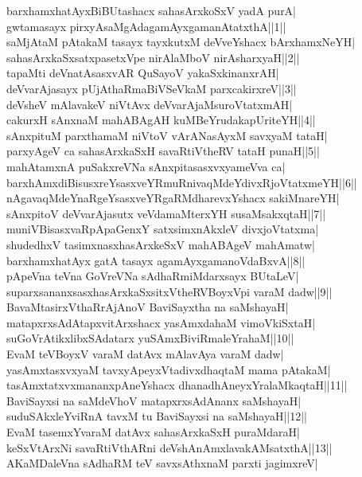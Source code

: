\documentclass{article}
\begin{document}
barxhamxhatAyxBiBUtashacx sahasArxkoSxV yadA purA|\\
gwtamasayx pirxyAsaMgAdagamAyxgamanAtatxthA||1||\\
saMjAtaM pAtakaM tasayx tayxkutxM deVveYshacx bArxhamxNeYH|\\
sahasArxkaSxsatxpasetxVpe nirAlaMboV nirAsharxyaH||2||\\
tapaMti deVnatAsasxvAR QuSayoV yakaSxkinanxrAH|\\
deVvarAjasayx pUjAthaRmaBiVSeVkaM parxcakirxreV||3||\\
deVsheV mAlavakeV niVtAvx deVvarAjaMsuroVtatxmAH|\\
cakurxH sAnxnaM mahABAgAH kuMBeYrudakapUriteYH||4||\\
sAnxpituM parxthamaM niVtoV vArANasAyxM savxyaM tataH|\\
parxyAgeV ca sahasArxkaSxH savaRtiVtheRV tataH punaH||5||\\
mahAtamxnA puSakxreVNa sAnxpitasasxvxyameVva ca|\\
barxhAmxdiBisusxreYsasxveYRmuRnivaqMdeYdivxRjoVtatxmeYH||6||\\
nAgavaqMdeYnaRgeYsasxveYRgaRMdharevxYshacx sakiMnareYH|\\
sAnxpitoV deVvarAjasutx veVdamaMterxYH susaMsakxqtaH||7||\\
muniVBisasxvaRpApaGenxY satxsimxnAkxleV divxjoVtatxma|\\
shudedhxV tasimxnasxhasArxkeSxV mahABAgeV mahAmatw|\\
barxhamxhatAyx gatA tasayx agamAyxgamanoVdaBxvA||8||\\
pApeVna teVna GoVreVNa sAdhaRmiMdarxsayx BUtaLeV|\\
suparxsananxsasxhasArxkaSxsitxVtheRVBoyxVpi varaM dadw||9||\\
BavaMtasirxVthaRrAjAnoV BaviSayxtha na saMshayaH|\\
matapxrxsAdAtapxvitArxshacx yasAmxdahaM vimoVkiSxtaH|\\
suGoVrAtikxlibxSAdatarx yuSAmxBiviRmaleYrahaM||10||\\
EvaM teVBoyxV varaM datAvx mAlavAya varaM dadw|\\
yasAmxtasxvxyaM tavxyApeyxVtadivxdhaqtaM mama pAtakaM|\\
tasAmxtatxvxmananxpAneYshacx dhanadhAneyxYralaMkaqtaH||11||\\
BaviSayxsi na saMdeVhoV matapxrxsAdAnanx saMshayaH|\\
suduSAkxleYviRnA tavxM tu BaviSayxsi na saMshayaH||12||\\
EvaM tasemxYvaraM datAvx sahasArxkaSxH puraMdaraH|\\
keSxVtArxNi savaRtiVthARni deVshAnAmxlavakAMsatxthA||13||\\
AKaMDaleVna sAdhaRM teV savxsAthxnaM parxti jagimxreV|\\
\end{document}
